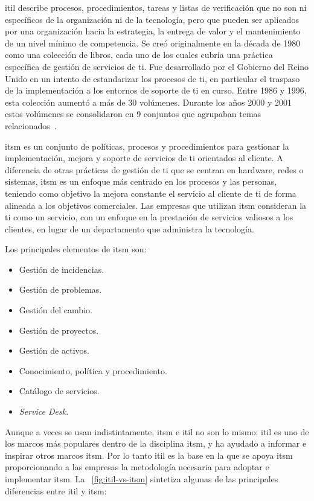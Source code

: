 \acrfull{itil} describe procesos, procedimientos, tareas y listas de verificación que no son ni específicos de la organización ni de la tecnología, pero que pueden ser aplicados por una organización hacia la estrategia, la entrega de valor y el mantenimiento de un nivel mínimo de competencia. Se creó originalmente en la década de 1980 como una colección de libros, cada uno de los cuales cubría una práctica específica de gestión de servicios de \acrshort{ti}. Fue desarrollado por el Gobierno del Reino Unido en un intento de estandarizar los procesos de \acrshort{ti}, en particular el traspaso de la implementación a los entornos de soporte de \acrshort{ti} en curso. Entre 1986 y 1996, esta colección aumentó a más de 30 volúmenes. Durante los años 2000 y 2001 estos volúmenes se consolidaron en 9 conjuntos que agrupaban temas relacionados~\cite{Exin, ItilWiki}. 


\acrfull{itsm} es un conjunto de políticas, procesos y procedimientos para gestionar la implementación, mejora y soporte de servicios de \acrshort{ti} orientados al cliente. A diferencia de otras prácticas de gestión de \acrshort{ti} que se centran en hardware, redes o sistemas, \acrshort{itsm} es un enfoque más centrado en los procesos y las personas, teniendo como objetivo la mejora constante el servicio al cliente de \acrshort{ti} de forma alineada a los objetivos comerciales. Las empresas que utilizan \acrshort{itsm} consideran la \acrshort{ti} como un servicio, con un enfoque en la prestación de servicios valiosos a los clientes, en lugar de un departamento que administra la tecnología.

Los principales elementos de \acrshort{itsm} son:
\begin{itemize}
\item Gestión de incidencias.
\item Gestión de problemas. 
\item Gestión del cambio. 
\item Gestión de proyectos. 
\item Gestión de activos. 
\item Conocimiento, política y procedimiento. 
\item Catálogo de servicios. 
\item \textit{Service Desk.}
\end{itemize}

Aunque a veces se usan indistintamente, \acrshort{itsm} e \acrshort{itil} no son lo mismo: \acrshort{itil} es uno de los marcos más populares dentro de la disciplina \acrshort{itsm}, y ha ayudado a informar e inspirar otros marcos \acrshort{itsm}. Por lo tanto \acrshort{itil} es la base en la que se apoya \acrshort{itsm} proporcionando a las empresas la metodología necesaria para adoptar e implementar \acrshort{itsm}. La \figurename~\ref{fig:itil-vs-itsm} sintetiza algunas de las principales diferencias entre \acrshort{itil} y \acrshort{itsm}:

